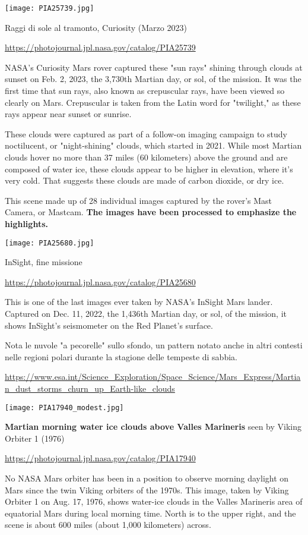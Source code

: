 \documentclass[a4paper,10pt,openany,oneside]{memoir}
\begin{document}
\hfill

\texttt{[image: PIA25739.jpg]}

Raggi di sole al tramonto, Curiosity (Marzo 2023)

\url{https://photojournal.jpl.nasa.gov/catalog/PIA25739}

NASA's Curiosity Mars rover captured these "sun rays" shining through clouds at sunset on Feb. 2, 2023, the 3,730th Martian day, or sol, of the mission. It was the first time that sun rays, also known as crepuscular rays, have been viewed so clearly on Mars. Crepuscular is taken from the Latin word for "twilight," as these rays appear near sunset or sunrise.

These clouds were captured as part of a follow-on imaging campaign to study noctilucent, or "night-shining" clouds, which started in 2021. While most Martian clouds hover no more than 37 miles (60 kilometers) above the ground and are composed of water ice, these clouds appear to be higher in elevation, where it's very cold. That suggests these clouds are made of carbon dioxide, or dry ice.

This scene made up of 28 individual images captured by the rover's Mast Camera, or Mastcam. \textbf{The images have been processed to emphasize the highlights.}


\texttt{[image: PIA25680.jpg]}

InSight, fine missione

\url{https://photojournal.jpl.nasa.gov/catalog/PIA25680}

This is one of the last images ever taken by NASA's InSight Mars lander. Captured on Dec. 11, 2022, the 1,436th Martian day, or sol, of the mission, it shows InSight's seismometer on the Red Planet's surface.

Nota le nuvole "a pecorelle" sullo sfondo, un pattern notato anche in altri contesti nelle regioni polari durante la stagione delle tempeste di sabbia.

\url{https://www.esa.int/Science_Exploration/Space_Science/Mars_Express/Martian_dust_storms_churn_up_Earth-like_clouds}


\texttt{[image: PIA17940\_modest.jpg]}

\textbf{Martian morning water ice clouds above Valles Marineris} seen by Viking Orbiter 1 (1976)

\url{https://photojournal.jpl.nasa.gov/catalog/PIA17940}

No NASA Mars orbiter has been in a position to observe morning daylight on Mars since the twin Viking orbiters of the 1970s. This image, taken by Viking Orbiter 1 on Aug. 17, 1976, shows water-ice clouds in the Valles Marineris area of equatorial Mars during local morning time. North is to the upper right, and the scene is about 600 miles (about 1,000 kilometers) across.
\end{document}
